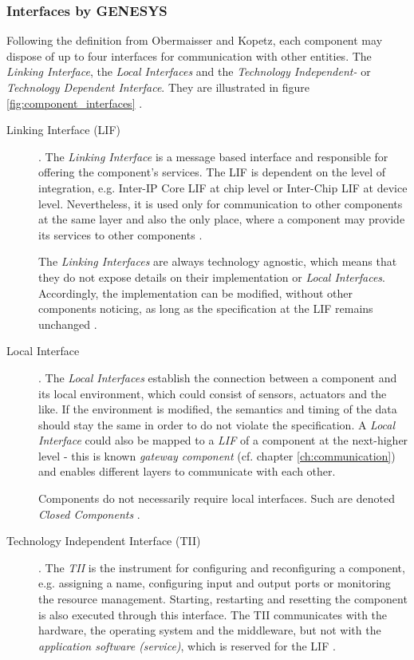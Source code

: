 \subsubsection{Interfaces by GENESYS}
Following the definition from Obermaisser and Kopetz, each component may dispose of up to four interfaces for communication with other entities. The \emph{Linking Interface}, the \emph{Local Interfaces} and the \emph{Technology Independent-} or \emph{Technology Dependent Interface}. They are illustrated in figure \ref{fig:component_interfaces} \cite[p.40-41]{genesys}.

\begin{description}
\item [Linking Interface (LIF)]. 
The \emph{Linking Interface} is a message based interface and responsible for offering the component's services. The LIF is dependent on the level of integration, e.g. Inter-IP Core LIF at chip level or Inter-Chip LIF at device level. Nevertheless, it is used only for communication to other components at the same layer and also the only place, where a component may provide its services to other components \cite[p.9]{genesys}.

The \emph{Linking Interfaces} are always technology agnostic, which means that they do not expose details on their implementation or \emph{Local Interfaces}. Accordingly, the implementation can be modified, without other components noticing, as long as the specification at the LIF remains unchanged \cite[p.9, 40-41]{genesys}.

\item [Local Interface]. 
The \emph{Local Interfaces} establish the connection between a component and its local environment, which could consist of sensors, actuators and the like. If the environment is modified, the semantics and timing of the data should stay the same in order to do not violate the specification. A \emph{Local Interface} could also be mapped to a \emph{LIF} of a component at the next-higher level - this is known \emph{gateway component} (cf. chapter \ref{ch:communication}) and enables different layers to communicate with each other.

Components do not necessarily require local interfaces. Such are denoted \emph{Closed Components} \cite[p.40-41]{genesys}.

\item [Technology Independent Interface (TII)].
The \emph{TII} is the instrument for configuring and reconfiguring a component, e.g. assigning a name, configuring input and output ports or monitoring the resource management. Starting, restarting and resetting the component is also executed through this interface. The TII communicates with the hardware, the operating system and the middleware, but not with the \emph{application software (service)}, which is reserved for the LIF \cite[p.40-41]{genesys}.


\end{description}
